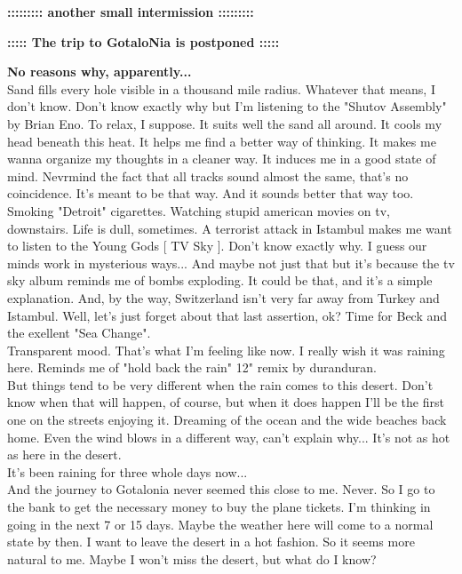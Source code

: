 \documentclass[11pt,twoside,a4paper]{book}
\begin{document}
\begin{multicols*}{2}
\textbf{ {\small ::::::::: another small intermission :::::::::} } %

\textbf{ {\small ::::: The trip to GotaloNia is postponed :::::} } %

\textbf{ {\small No reasons why, apparently...} } ~\\

Sand fills every hole visible in a thousand mile radius. Whatever that means, I don't know. Don't know exactly why but I'm listening to the "Shutov Assembly" by Brian Eno. To relax, I suppose. It suits well the sand all around. It cools my head beneath this heat. It helps me find a better way of thinking. It makes me wanna organize my thoughts in a cleaner way. It induces me in a good state of mind. Nevrmind the fact that all tracks sound almost the same, that's no coincidence. It's meant to be that way. And it sounds better that way too. ~\\

Smoking "Detroit" cigarettes. Watching stupid american movies on tv, downstairs. Life is dull, sometimes. A terrorist attack in Istambul makes me want to listen to the Young Gods [ TV Sky ]. Don't know exactly why. I guess our minds work in mysterious ways... And maybe not just that but it's because the tv sky album reminds me of bombs exploding. It could be that, and it's a simple explanation. And, by the way, Switzerland isn't very far away from Turkey and Istambul. Well, let's just forget about that last assertion, ok? Time for Beck and the exellent "Sea Change". ~\\

Transparent mood. That's what I'm feeling like now. I really wish it was raining here. Reminds me of "hold back the rain" 12" remix by duranduran. ~\\

But things tend to be very different when the rain comes to this desert. Don't know when that will happen, of course, but when it does happen I'll be the first one on the streets enjoying it. Dreaming of the ocean and the wide beaches back home. Even the wind blows in a different way, can't explain why... It's not as hot as here in the desert. ~\\

{\large It's been raining for three whole days now...} ~\\

And the journey to Gotalonia never seemed this close to me. Never. So I go to the bank to get the necessary money to buy the plane tickets. I'm thinking in going in the next 7 or 15 days. Maybe the weather here will come to a normal state by then. I want to leave the desert in a hot fashion. So it seems more natural to me. Maybe I won't miss the desert, but what do I know? ~\\


\end{multicols*}
\end{document}
